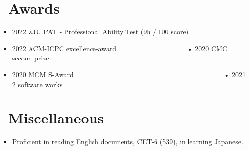 \documentclass{resume}
\begin{document}



\section{\faCalendarCheckO\ Awards}
\begin{itemize}[parsep=0.5ex]
  \item 2022 ZJU PAT - Professional Ability Test (95 / 100 score) 
  \item 2022 ACM-ICPC excellence-award \ \ \ \ \ \ \ \ \ \ \ \ \ \ \ \ \ \ \ \  • 2020 CMC second-prize
  \item 2020 MCM S-Award \ \ \ \ \ \ \ \ \ \ \ \ \ \ \ \ \ \ \ \ \ \ \ \ \ \ \ \ \ \ \ \ \ \ \ \ \ \ \ \ \ \ \ • 2021 2 software works
\end{itemize}

\section{\faPlusCircle\ Miscellaneous}
\begin{itemize}[parsep=0.5ex]
  \item Proficient in reading English documents, CET-6 (539), in learning Japanese.
\end{itemize}

%
%
\end{document}
